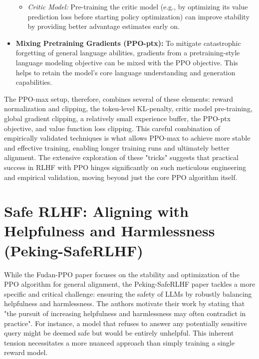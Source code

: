 \documentclass{article}
\begin{document}
\begin{itemize}
\begin{itemize}
            \item \textit{Critic Model:} Pre-training the critic model (e.g., by optimizing its value prediction loss before starting policy optimization) can improve stability by providing better advantage estimates early on. \cite{Zheng2023PPO}
        \end{itemize}
    \item \textbf{Mixing Pretraining Gradients (PPO-ptx):} To mitigate catastrophic forgetting of general language abilities, gradients from a pretraining-style language modeling objective can be mixed with the PPO objective. \cite{Zheng2023PPO} This helps to retain the model's core language understanding and generation capabilities.
\end{itemize}
The PPO-max setup, therefore, combines several of these elements: reward normalization and clipping, the token-level KL-penalty, critic model pre-training, global gradient clipping, a relatively small experience buffer, the PPO-ptx objective, and value function loss clipping. \cite{Zheng2023PPO} This careful combination of empirically validated techniques is what allows PPO-max to achieve more stable and effective training, enabling longer training runs and ultimately better alignment. The extensive exploration of these "tricks" suggests that practical success in RLHF with PPO hinges significantly on such meticulous engineering and empirical validation, moving beyond just the core PPO algorithm itself.

\section{Safe RLHF: Aligning with Helpfulness and Harmlessness (Peking-SafeRLHF)}
\label{sec:peking_safe_rlhf}

While the Fudan-PPO paper focuses on the stability and optimization of the PPO algorithm for general alignment, the Peking-SafeRLHF paper \cite{Dai2023SafeRLHF} tackles a more specific and critical challenge: ensuring the safety of LLMs by robustly balancing helpfulness and harmlessness. The authors motivate their work by stating that "the pursuit of increasing helpfulness and harmlessness may often contradict in practice". \cite{Dai2023SafeRLHF} For instance, a model that refuses to answer any potentially sensitive query might be deemed safe but would be entirely unhelpful. This inherent tension necessitates a more nuanced approach than simply training a single reward model.
\end{document}
